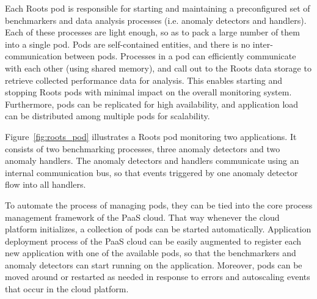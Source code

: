 Each Roots pod is responsible for starting and maintaining a preconfigured set of
benchmarkers and data analysis processes (i.e. anomaly detectors and handlers). 
Each of these processes are light enough, so as to pack a large number of them
into a single pod. Pods are self-contained entities, and there is no inter-communication
between pods. Processes in a pod can efficiently communicate with each other 
(using shared memory), and call out to the Roots data storage to retrieve 
collected performance data for analysis. This enables starting and stopping 
Roots pods with minimal impact on the overall monitoring system. Furthermore, pods
can be replicated for high availability, and application load can be distributed
among multiple pods for scalability.

Figure~\ref{fig:roots_pod} illustrates a Roots pod monitoring two applications.
It consists of two benchmarking processes, three anomaly detectors and 
two anomaly handlers. The anomaly detectors and handlers communicate
using an internal communication bus, so that events triggered by one anomaly
detector flow into all handlers. 

To automate the process of managing pods, they can be tied into the core
process management framework of the PaaS cloud. That way whenever the cloud
platform initializes, a collection of pods can be started automatically.
Application deployment process of the PaaS cloud can be easily augmented
to register each new application with one of the available pods, so that the
benchmarkers and anomaly detectors can start running on the application.
Moreover, pods can be moved around or restarted as needed in response
to errors and autoscaling events that occur in the cloud platform.
